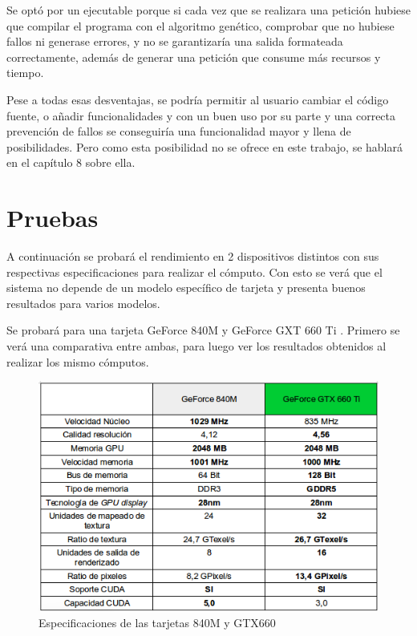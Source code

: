 \bigskip
Se optó por un ejecutable porque si cada vez que se realizara una petición hubiese que compilar el programa con el algoritmo genético, comprobar que no hubiese fallos ni generase errores, y no se garantizaría una salida formateada correctamente, además de generar una petición que consume más recursos y tiempo.

\bigskip
Pese a todas esas desventajas, se podría permitir al usuario cambiar el código fuente, o añadir funcionalidades y con un buen uso por su parte y una correcta prevención de fallos se conseguiría una funcionalidad mayor y llena de posibilidades. Pero como esta posibilidad no se ofrece en este trabajo, se hablará en el capítulo 8 sobre ella.


\newpage
\section{Pruebas}
\bigskip

A continuación se probará el rendimiento en 2 dispositivos distintos con sus respectivas especificaciones para realizar el cómputo. Con esto se verá que el sistema no depende de un modelo específico de tarjeta y presenta buenos resultados para varios modelos.

Se probará para una tarjeta GeForce 840M \cite{geforce840m} y GeForce GXT 660 Ti \cite{geforcegtx660}. Primero se verá una comparativa entre ambas, para luego ver los resultados obtenidos al realizar los mismo cómputos.

\bigskip
\begin{figure}[h]
	\centering
	\includegraphics[width=1\linewidth]{../images/especificaciones}
	\caption[Especificaciones de las tarjetas 840M y GTX660]{Especificaciones de las tarjetas 840M y GTX660}
	\label{fig:especificaciones}
\end{figure}


